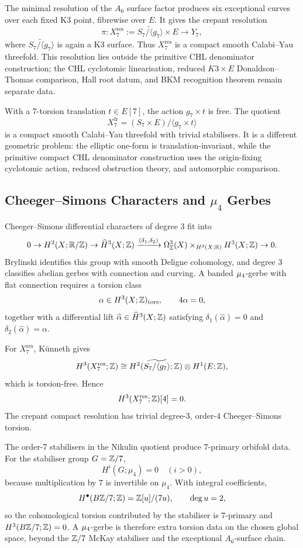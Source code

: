 The minimal resolution of the \(A_6\) surface factor produces six
exceptional curves over each fixed K3 point, fibrewise over \(E\).
It gives the crepant resolution
\[
  \pi\colon
  X_7^{\mathrm{res}}
  :=
  \widetilde{S_7/\langle g_7\rangle}\times E
  \longrightarrow
  Y_7 ,
\]
where \(\widetilde{S_7/\langle g_7\rangle}\) is again a K3 surface.
Thus \(X_7^{\mathrm{res}}\) is a compact smooth Calabi--Yau threefold.
This resolution lies outside the primitive CHL denominator construction;
the CHL cyclotomic linearisation, reduced \(K3\times E\)
Donaldson--Thomas comparison, Hall root datum, and BKM recognition
theorem remain separate data.

With a \(7\)-torsion translation \(t\in E[7]\), the action
\(g_7\times t\) is free.  The quotient
\[
  X_7^{\mathrm{fr}}=(S_7\times E)/\langle g_7\times t\rangle
\]
is a compact smooth Calabi--Yau threefold with trivial stabilisers.
It is a different geometric problem: the elliptic one-form is
translation-invariant, while the primitive compact CHL denominator
construction uses the origin-fixing cyclotomic action, reduced
obstruction theory, and automorphic comparison.

\subsection*{Cheeger--Simons Characters and \texorpdfstring{\(\mu_4\)}{mu4} Gerbes}

Cheeger--Simons differential characters of degree \(3\) fit into
\[
0\to H^{2}(X;\mathbb{R}/\mathbb{Z})\to \widehat{H}^{3}(X;\mathbb{Z})
\xrightarrow{(\delta_1,\delta_2)}
\Omega^{3}_{\mathbb{Z}}(X)\times_{H^{3}(X;\mathbb{R})}H^{3}(X;\mathbb{Z})\to 0.
\]
Brylinski identifies this group with smooth Deligne cohomology, and
degree \(3\) classifies abelian gerbes with connection and curving.
A banded \(\mu_{4}\)-gerbe with flat connection requires a torsion
class
\[
  \alpha\in H^{3}(X;\mathbb{Z})_{\mathrm{tors}},
  \qquad 4\alpha=0,
\]
together with a differential lift
\(\widehat\alpha\in\widehat{H}^{3}(X;\mathbb{Z})\) satisfying
\(\delta_1(\widehat\alpha)=0\) and
\(\delta_2(\widehat\alpha)=\alpha\).

For \(X_7^{\mathrm{res}}\), K\"unneth gives
\[
  H^3(X_7^{\mathrm{res}};\mathbb{Z})
  \cong
  H^2(\widetilde{S_7/\langle g_7\rangle};\mathbb{Z})
  \otimes H^1(E;\mathbb{Z}),
\]
which is torsion-free.  Hence
\[
  H^3(X_7^{\mathrm{res}};\mathbb{Z})[4]=0.
\]
The crepant compact resolution has trivial degree-\(3\), order-\(4\)
Cheeger--Simons torsion.

The order-7 stabilisers in the Nikulin quotient produce \(7\)-primary
orbifold data.  For the stabiliser group \(G=\mathbb{Z}/7\),
\[
  H^{i}(G;\mu_4)=0\quad(i>0),
\]
because multiplication by \(7\) is invertible on \(\mu_4\).  With
integral coefficients,
\[
  H^\bullet(B\mathbb{Z}/7;\mathbb{Z})=\mathbb{Z}[u]/(7u),\qquad \deg u=2,
\]
so the cohomological torsion contributed by the stabiliser is
\(7\)-primary and \(H^3(B\mathbb{Z}/7;\mathbb{Z})=0\).  A \(\mu_{4}\)-gerbe is
therefore extra torsion data on the chosen global space, beyond the
\(\mathbb{Z}/7\) McKay stabiliser and the exceptional \(A_6\)-surface chain.

